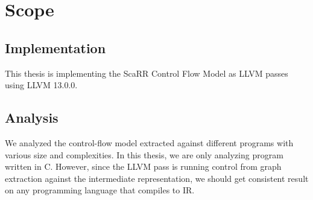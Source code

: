 
\chapter{Scope} %

\label{Chapter2} %

\section{Implementation}
This thesis is implementing the ScaRR Control Flow Model as LLVM passes using LLVM 13.0.0. 

\section{Analysis}

We analyzed the control-flow model extracted against different programs with various size and complexities. In this thesis, we are only analyzing program written in C. However, since the LLVM pass is running control from graph extraction against the intermediate representation, we should get consistent result on any programming language that compiles to IR.